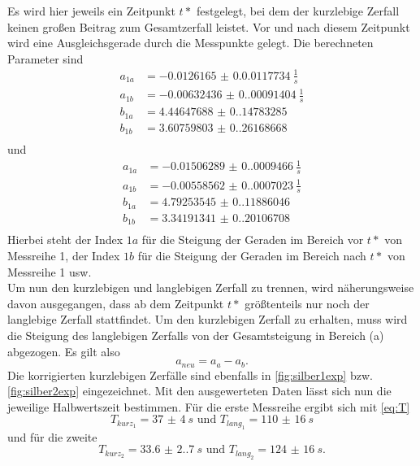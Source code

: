 Es wird hier jeweils ein Zeitpunkt $t*$ festgelegt, bei dem der kurzlebige Zerfall keinen großen Beitrag zum Gesamtzerfall leistet. Vor und nach diesem Zeitpunkt wird 
eine Ausgleichsgerade durch die Messpunkte gelegt. Die berechneten Parameter sind
\begin{align*}
  a_{1a} &= \SI{-0.0126165(0.00117734)}{\frac{1}{s}}\\
  a_{1b} &= \SI{-0.00632436(0.00091404)}{\frac{1}{s}}\\
  b_{1a} &= \SI{4.44647688(0.14783285)}{}\\
  b_{1b} &= \SI{3.60759803(0.26168668)}{}\\
\end{align*}
und 
\begin{align*}
  a_{1a} &= \SI{-0.01506289(0.0009466)}{\frac{1}{s}}\\
  a_{1b} &= \SI{-0.00558562(0.0007023)}{\frac{1}{s}}\\
  b_{1a} &= \SI{4.79253545(0.11886046)}{}\\
  b_{1b} &= \SI{3.34191341(0.20106708)}{}\\
\end{align*}
Hierbei steht der Index $1a$ für die Steigung der Geraden im Bereich vor $t*$ von Messreihe 1, der Index $1b$ für die Steigung der Geraden im Bereich nach $t*$ von Messreihe 1
usw.\\
Um nun den kurzlebigen und langlebigen Zerfall zu trennen, wird näherungsweise davon ausgegangen, dass ab dem Zeitpunkt $t*$ größtenteils nur noch der langlebige Zerfall 
stattfindet. Um den kurzlebigen Zerfall zu erhalten, muss wird die Steigung des langlebigen Zerfalls von der Gesamtsteigung in Bereich (a) abgezogen. Es gilt also 
\begin{equation*}
  a_{neu} = a_{a} - a_{b}.
\end{equation*}
Die korrigierten kurzlebigen Zerfälle sind ebenfalls in \autoref{fig:silber1exp} bzw. \autoref{fig:silber2exp} eingezeichnet.
Mit den ausgewerteten Daten lässt sich nun die jeweilige Halbwertszeit bestimmen.
Für die erste Messreihe ergibt sich mit \autoref{eq:T}
\begin{equation*}
  T_{kurz_{1}} = \SI{37(4)}{s} \text{ und } T_{lang_{1}} = \SI{110(16)}{s} 
\end{equation*}
und für die zweite
\begin{equation*}
  T_{kurz_{2}} = \SI{33.6(2.7)}{s} \text{ und } T_{lang_{2}} = \SI{124(16)}{s}.
\end{equation*}
